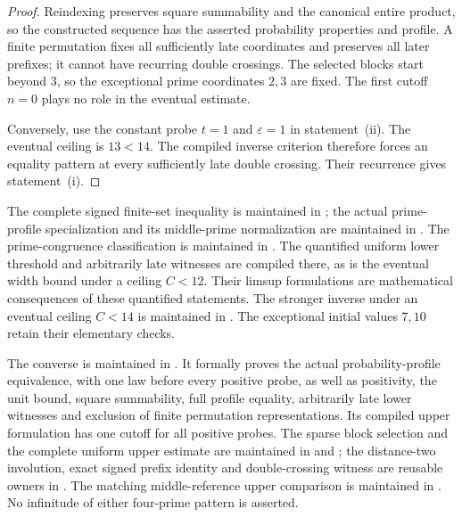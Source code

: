 \documentclass[11pt]{article}
\theoremstyle{definition}
\begin{document}
\begin{proof}
Reindexing preserves square summability and the canonical entire
product, so the constructed sequence has the asserted probability
properties and profile. A finite permutation fixes all sufficiently
late coordinates and preserves all later prefixes; it cannot have
recurring double crossings. The selected blocks start beyond $3$,
so the exceptional prime coordinates $2,3$ are fixed. The first
cutoff $n=0$ plays no role in the eventual estimate.

Conversely, use the constant probe $t=1$ and $\varepsilon=1$ in
statement~(ii). The eventual ceiling is $13<14$. The compiled inverse
criterion therefore forces an equality pattern at every sufficiently
late double crossing. Their recurrence gives statement~(i).
\end{proof}

The complete signed finite-set inequality is maintained in
; the actual
prime-profile specialization and its middle-prime normalization are
maintained in .
The prime-congruence classification is maintained in
.
The quantified uniform lower threshold and arbitrarily late witnesses
are compiled there, as is the eventual width bound under a ceiling
$C<12$. Their limsup formulations are mathematical consequences of
these quantified statements. The stronger inverse under an eventual
ceiling $C<14$ is maintained in
.
The exceptional initial values $7,10$ retain their elementary checks.

\begin{sloppypar}
The converse is maintained in
.
It formally proves the actual probability-profile equivalence, with
one law before every positive probe, as well as positivity, the unit
bound, square summability, full profile equality, arbitrarily late
lower witnesses and exclusion of finite permutation representations.
Its compiled upper formulation has one cutoff for all positive probes.
The sparse block selection and the complete uniform upper estimate
are maintained in  and
; the distance-two
involution, exact signed prefix identity and double-crossing witness
are reusable owners in
.
The matching middle-reference upper comparison is maintained in
.
No infinitude of either four-prime pattern is asserted.
\end{sloppypar}
\end{document}
